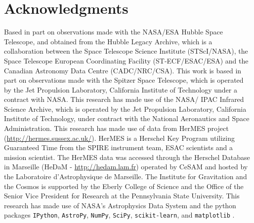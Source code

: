 \documentclass[preprint,natbib209]{aastex}
\begin{document}
\acknowledgments
\section*{Acknowledgments}
Based in part on observations made with the NASA/ESA Hubble Space Telescope, 
and obtained from the Hubble Legacy Archive, which is a collaboration between
the Space Telescope Science Institute (STScI/NASA), the Space Telescope 
European Coordinating Facility (ST-ECF/ESAC/ESA) and the 
Canadian Astronomy Data Centre (CADC/NRC/CSA). 
This work is based in part on observations made with the Spitzer Space Telescope, 
which is operated by the Jet Propulsion Laboratory, California Institute of Technology under a contract with NASA.
This research has made use of the NASA/ IPAC Infrared Science Archive, 
which is operated by the Jet Propulsion Laboratory, California Institute of Technology, 
under contract with the National Aeronautics and Space Administration.
This research has made use of data from HerMES project (\url{http://hermes.sussex.ac.uk/}). 
HerMES is a Herschel Key Program utilizing Guaranteed Time from the SPIRE instrument team,
 ESAC scientists and a mission scientist.
The HerMES data was accessed through the Herschel Database in 
Marseille (HeDaM - \url{http://hedam.lam.fr}) operated by CeSAM and
 hosted by the Laboratoire d'Astrophysique de Marseille.
The Institute for Gravitation and the Cosmos is 
supported by the Eberly College of Science and the Office of the Senior Vice
President for Research at the Pennsylvania 
State University. This research has made use of NASA's Astrophysics Data System 
and the python packages \texttt{IPython}, \texttt{AstroPy}, 
\texttt{NumPy}, \texttt{SciPy}, \texttt{scikit-learn}, and \texttt{matplotlib}
 \citep{ipython, astropy, numpy, scipy, scikit-learn, matplotlib}.



\end{document}
